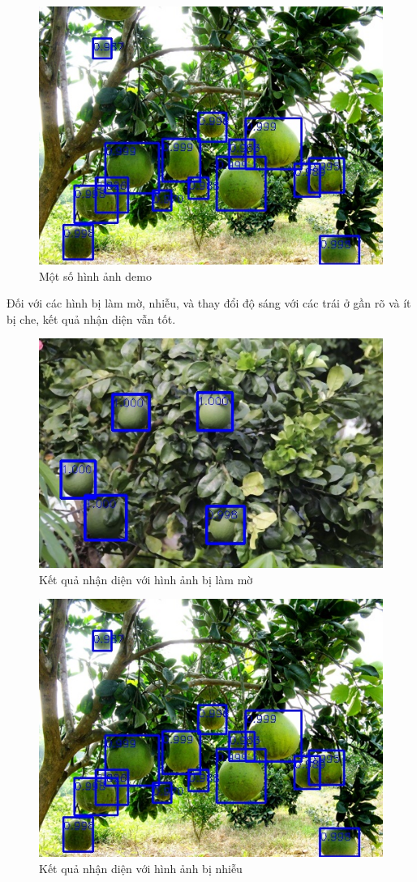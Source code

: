 \begin{center}
    \begin{figure}[H]
    \centering
    \includegraphics[width=0.6\columnwidth]{images/chap3/demo_004.jpg}
    \caption{Một số hình ảnh demo}
    \label{chap3:good2}
    \end{figure}
\end{center}
Đối với các hình bị làm mờ, nhiễu, và thay đổi độ sáng với các trái ở gần rõ và ít bị che, kết quả nhận diện vẫn tốt.
\begin{center}
    \begin{figure}[H]
    \centering
    \includegraphics[width=0.6\columnwidth]{images/chap3/demo_006.jpg}
    \caption{Kết quả nhận diện với hình ảnh bị làm mờ}
    \label{chap3:good4}
    \end{figure}
\end{center}
\begin{center}
    \begin{figure}[H]
    \centering
    \includegraphics[width=0.6\columnwidth]{images/chap3/demo_007.jpg}
    \caption{Kết quả nhận diện với hình ảnh bị nhiễu}
    \label{chap3:good5}
    \end{figure}
\end{center}


